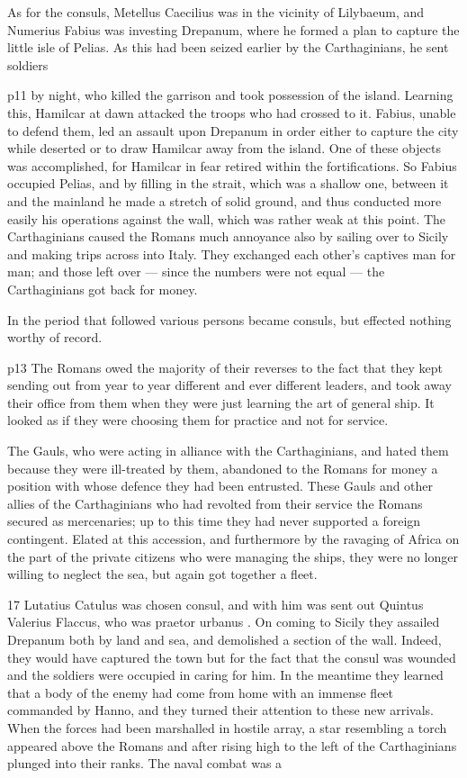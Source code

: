 As for the consuls, Metellus Caecilius was in the vicinity of Lilybaeum, and Numerius Fabius was investing Drepanum, where he formed a plan to capture the little isle of Pelias. As this had been seized earlier by the Carthaginians, he sent soldiers

p11 by night, who killed the garrison and took possession of the island. Learning this, Hamilcar at dawn attacked the troops who had crossed to it. Fabius, unable to defend them, led an assault upon Drepanum in order either to capture the city while deserted or to draw Hamilcar away from the island. One of these objects was accomplished, for Hamilcar in fear retired within the fortifications. So Fabius occupied Pelias, and by filling in the strait, which was a shallow one, between it and the mainland he made a stretch of solid ground, and thus conducted more easily his operations against the wall, which was rather weak at this point. The Carthaginians caused the Romans much annoyance also by sailing over to Sicily and making trips across into Italy. They exchanged each other's captives man for man; and those left over \texthebrew{—} since the numbers were not equal \texthebrew{—} the Carthaginians got back for money.

In the period that followed various persons became consuls, but effected nothing worthy of record.

p13 The Romans owed the majority of their reverses to the fact that they kept sending out from year to year different and ever different leaders, and took away their office from them when they were just learning the art of general ­ship. It looked as if they were choosing them for practice and not for service.

The Gauls, who were acting in alliance with the Carthaginians, and hated them because they were ill-treated by them, abandoned to the Romans for money a position with whose defence they had been entrusted. These Gauls and other allies of the Carthaginians who had revolted from their service the Romans secured as mercenaries; up to this time they had never supported a foreign contingent. Elated at this accession, and furthermore by the ravaging of Africa on the part of the private citizens who were managing the ships, they were no longer willing to neglect the sea, but again got together a fleet.

17
Lutatius Catulus was chosen consul, and with him was sent out Quintus Valerius Flaccus, who was praetor urbanus . On coming to Sicily they assailed Drepanum both by land and sea, and demolished a section of the wall. Indeed, they would have captured the town but for the fact that the consul was wounded and the soldiers were occupied in caring for him. In the meantime they learned that a body of the enemy had come from home with an immense fleet commanded by Hanno, and they turned their attention to these new arrivals. When the forces had been marshalled in hostile array, a star resembling a torch appeared above the Romans and after rising high to the left of the Carthaginians plunged into their ranks. The naval combat was a

